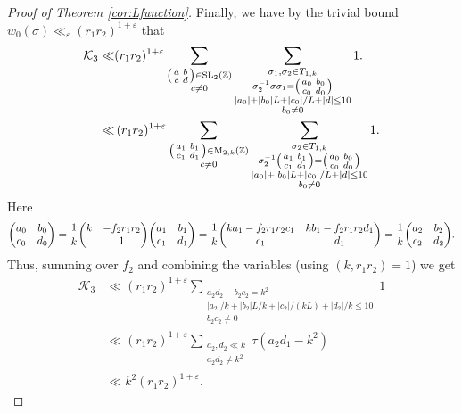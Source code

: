 \documentclass[12pt]{amsart}
\theoremstyle{definition}
\theoremstyle{remark}
\numberwithin{equation}{section}
\newcommand{\Z}{{\mathbb Z}}
\newcommand{\1}{{\mathbf 1}}
\newcommand{\eps}{\varepsilon}
\newcommand{\SL}{\operatorname{SL}_2}
\newcommand{\MM}{\operatorname{M}}
\renewcommand{\c}{\mathfrak c}
\begin{document}
\begin{proof}[Proof of Theorem \ref{cor:Lfunction}]
Finally, we have by the trivial bound $w_0(\sigma) \ll_\eps (r_1r_2)^{1+\eps}$ that
\begin{align*}
      \mathcal{K}_{3} \ll & (r_1r_2)^{1+\eps}   \sum_{\substack{\smqty(a & b \\ c & d) \in \SL(\Z) \\ c \neq 0  }}\sum_{\substack{\sigma_1,\sigma_2 \in T_{1,k} \\   \sigma_2^{-1} \sigma \sigma_1 = \smqty(a_0 & b_0 \\c_0 & d_0 ) \\ |a_0| + |b_0| L + |c_0|/L + |d| \leq 10 \\ b_0 \neq 0  }} 1.
     \\  \ll & \,  (r_1r_2)^{1+\eps}   \sum_{\substack{\smqty(a_1 & b_1 \\ c_1 & d_1) \in \MM_{2,k}(\Z) \\ c \neq 0 \\ }}\sum_{\substack{\sigma_2 \in T_{1,k} \\   \sigma_2^{-1} \smqty(a_1 & b_1 \\ c_1 & d_1) = \smqty(a_0 & b_0 \\c_0 & d_0 ) \\ |a_0| + |b_0| L + |c_0|/L + |d| \leq 10 \\ b_0 \neq 0}} 1. 
\end{align*}
Here
\begin{align*}
   \mqty(a_0 & b_0 \\c_0 & d_0 )  =  \frac{1}{k} \mqty(k & -f_2 r_1r_2 \\ & 1) \mqty(a_1 & b_1 \\ c_1 & d_1)  = \frac{1}{k} \mqty(k a_1-f_2 r_1r_2  c_1 & k b_1-f_2 r_1r_2  d_1 \\ c_1 & d_1) = \frac{1}{k} \mqty(a_2 & b_2 \\ c_2 &  d_2).
\end{align*}
Thus, summing over $f_2$ and combining the variables (using $(k,r_1r_2)=1$) we get
\begin{align*}
  \mathcal{K}_{3} & \ll (r_1r_2)^{1+\eps} \sum_{\substack{a_2 d_2 -b_2 c_2 = k^2 \\ |a_2|/k + |b_2|L/k + |c_2|/(kL) + |d_2| /k \leq 10  \\ b_2 c_2 \neq  0}} 1 \\
   & \ll  (r_1r_2)^{1+\eps}  \sum_{\substack{a_2,d_2 \ll  k \\ a_2d_2 \neq k^2}} \tau(a_2 d_1 -k^2) \\
    & \ll  k^2(r_1r_2)^{1+\eps} .
\end{align*}
\end{proof}
\end{document}
